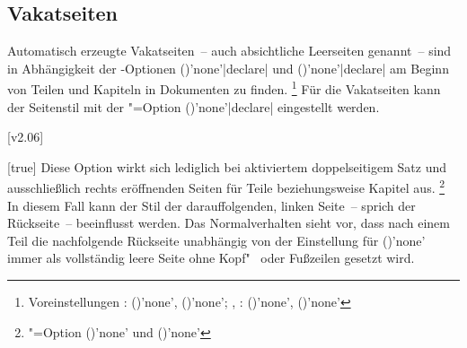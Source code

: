 \begin{Declaration*}{}
\begin{Declaration*}{}
\begin{Declaration*}{}
\subsection{Vakatseiten}
%
%
Automatisch erzeugte Vakatseiten~-- auch absichtliche Leerseiten genannt~-- 
sind in Abhängigkeit der 
\KOMAScript-Optionen ()'none'|declare| 
und ()'none'|declare| am 
Beginn von Teilen und Kapiteln in Dokumenten zu finden.%
\footnote{%
  Voreinstellungen
  : 
  ()'none', 
  ()'none';
  , : 
  ()'none', 
  ()'none'%
}
Für die Vakatseiten kann der Seitenstil mit der \KOMAScript"=Option 
()'none'|declare| 
eingestellt werden.

[v2.06]
\begin{Declaration}{}[true]%
\printdeclarationlist%
%
%
%
%
%
Diese Option wirkt sich lediglich bei aktiviertem doppelseitigem Satz und 
ausschließlich rechts eröffnenden Seiten für Teile beziehungsweise Kapitel
aus.%
\footnote{%
  \KOMAScript"=Option ()'none' und 
  ()'none'%
}
In diesem Fall kann der Stil der darauffolgenden, linken Seite~-- sprich der 
Rückseite~-- beeinflusst werden. Das Normalverhalten sieht vor, dass nach einem 
Teil die nachfolgende Rückseite unabhängig von der Einstellung für 
()'none' immer als vollständig 
leere Seite ohne Kopf"~ oder Fußzeilen gesetzt wird.


\end{Declaration}
\end{Declaration*}
\end{Declaration*}
\end{Declaration*}
